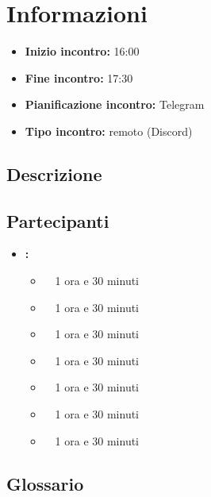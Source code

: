 \section{Informazioni}
\begin{itemize}
	\item \textbf{Inizio incontro:} 16:00
	\item \textbf{Fine incontro:} 17:30
	\item \textbf{Pianificazione incontro:} Telegram
	\item \textbf{Tipo incontro:} remoto (Discord)
\end{itemize}

\subsection{Descrizione}
\DocDescription

\subsection{Partecipanti}

\begin{itemize}
	\item \textbf{\GroupName:}
	\begin{itemize}
		\item \tommaso \ \rightarrow\ 1 ora e 30 minuti
		\item \marco \ \rightarrow\ 1 ora e 30 minuti
		\item \riccardo \ \rightarrow\ 1 ora e 30 minuti
		\item \raul \ \rightarrow\ 1 ora e 30 minuti
		\item \martina \ \rightarrow\ 1 ora e 30 minuti
		\item \sebastiano \ \rightarrow\ 1 ora e 30 minuti
		\item \mattia \ \rightarrow\ 1 ora e 30 minuti
	\end{itemize}
\end{itemize}

\subsection{Glossario}
\GlossarioIntroduzione

\clearpage